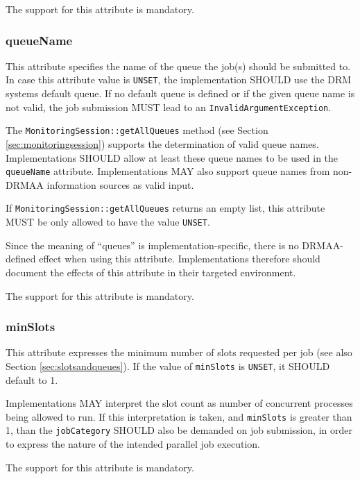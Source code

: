 \documentclass{article}
\newcommand{\h}[1]{\lstinline|#1|}
\newcommand{\rat}[1]{}
\begin{document}
The support for this attribute is mandatory.

\subsubsection{queueName}
\label{sec:queuename}

This attribute specifies the name of the queue the job(s) should be submitted to. In case this attribute value is \h{UNSET}, the implementation SHOULD use the DRM systems default queue.  If no default queue is defined or if the given queue name is not valid, the job submission MUST lead to an \h{InvalidArgumentException}.

The \h{MonitoringSession::getAllQueues} method (see Section \ref{sec:monitoringsession}) supports the determination of valid queue names. Implementations SHOULD allow at least these queue names to be used in the \h{queueName} attribute. Implementations MAY also support queue names from non-DRMAA information sources as valid input. 

If \h{MonitoringSession::getAllQueues} returns an empty list, this attribute MUST be only allowed to have the value \h{UNSET}. 

Since the meaning of \enquote{queues} is implementation-specific, there is no DRMAA-defined effect when using this attribute. Implementations therefore should document the effects of this attribute in their targeted environment. 

The support for this attribute is mandatory.

\rat{As one example, requesting a number of slots for a job in one queue has no implication on the number of utilized machines at run-time.}

\subsubsection{minSlots}

This attribute expresses the minimum number of slots requested per job (see also Section \ref{sec:slotsandqueues}). If the value of \h{minSlots} is \h{UNSET}, it SHOULD default to 1.

Implementations MAY interpret the slot count as number of concurrent processes being allowed to run. If this interpretation is taken, and \h{minSlots} is greater than 1, than the \h{jobCategory} SHOULD also be demanded on job submission, in order to express the nature of the intended parallel job execution.

The support for this attribute is mandatory.
\end{document}
